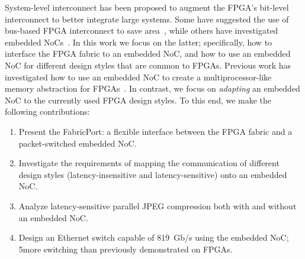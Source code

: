 {System-level interconnect has been proposed to augment the FPGA's bit-level interconnect to better integrate large systems.
Some have suggested the use of bus-based FPGA interconnect to save area~\cite{Ye2006}, while others have investigated embedded NoCs~\cite{micro, Francis2008, Goossens2008}.
In this work we focus on the latter; specifically, how to interface the FPGA fabric to an embedded NoC, and how to use an embedded NoC for different design styles that are common to FPGAs.
Previous work has investigated how to use an embedded NoC to create a multiprocessor-like memory abstraction for FPGAs~\cite{Chung2011}.
In contrast, we focus on \textit{adapting} an embedded NoC to the currently used FPGA design styles.
To this end, we make the following contributions:
%
%
\begin{enumerate}
\item Present the FabricPort: a flexible interface between the FPGA fabric and a packet-switched embedded NoC.
\item Investigate the requirements of mapping the communication of different design styles (latency-insensitive and latency-sensitive) onto an embedded NoC.
\item Analyze latency-sensitive parallel JPEG compression both with and without an embedded NoC.
\item Design an Ethernet switch capable of 819~Gb/s using the embedded NoC; 5\xx more switching than previously demonstrated on FPGAs.
\end{enumerate}
%
}

%
%

